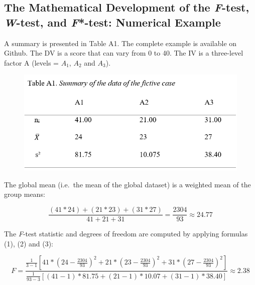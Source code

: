 \documentclass[man,floatsintext]{apa6}
\begin{document}
\begin{appendix}
\section{}
\setlength{\parindent}{0.0in}
\setlength{\leftskip}{0.0in}

\hypertarget{the-mathematical-development-of-the-f-test-w-test-and-f-test-numerical-example}{%
\subsection{\texorpdfstring{The Mathematical Development of the
\emph{F}-test, \emph{W}-test, and \emph{F}*-test: Numerical
Example}{The Mathematical Development of the F-test, W-test, and F*-test: Numerical Example}}\label{the-mathematical-development-of-the-f-test-w-test-and-f-test-numerical-example}}

A summary is presented in Table A1. The complete example is available on
Github. The DV is a score that can vary from 0 to 40. The IV is a
three-level factor A (levels = \(A_1\), \(A_2\) and \(A_3\)).

\begin{figure}
\includegraphics[width=1\linewidth]{Rmarkdown folder/Rmarkdown inputs/TableA1} \end{figure}

The global mean (i.e.~the mean of the global dataset) is a weighted mean
of the group means:

\[\frac{(41*24)+(21*23)+(31*27)}{41+21+31}=\frac{2304}{93} \approx 24.77\]

The \emph{F}-test statistic and degrees of freedom are computed by
applying formulas (1), (2) and (3):

\[
F=\frac{\frac{1}{3-1}[41*(24-\frac{2304}{93})^2+21*(23-\frac{2304}{93})^2+31*(27-\frac{2304}{93})^2]}
{\frac{1}{93-3}[(41-1)*81.75+(21-1)*10.07+(31-1)*38.40]} \approx 2.38
\]


\end{appendix}
\end{document}
